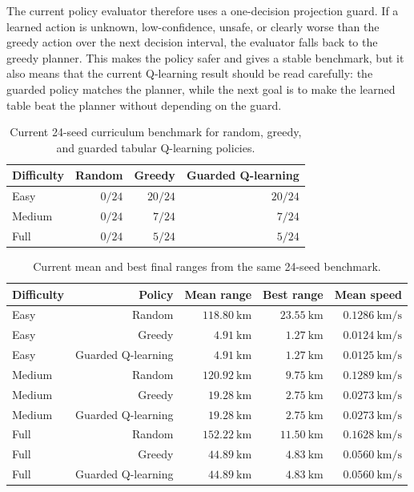 \documentclass[11pt]{article}
\begin{document}
The current policy evaluator therefore uses a one-decision projection guard.
If a learned action is unknown, low-confidence, unsafe, or clearly worse than the greedy action over the next decision interval, the evaluator falls back to the greedy planner.
This makes the policy safer and gives a stable benchmark, but it also means that the current Q-learning result should be read carefully: the guarded policy matches the planner, while the next goal is to make the learned table beat the planner without depending on the guard.

\begin{table}[h]
\centering
\begin{tabular}{lrrr}
\toprule
Difficulty & Random & Greedy & Guarded Q-learning \\
\midrule
Easy & \(0/24\) & \(20/24\) & \(20/24\) \\
Medium & \(0/24\) & \(7/24\) & \(7/24\) \\
Full & \(0/24\) & \(5/24\) & \(5/24\) \\
\bottomrule
\end{tabular}
\caption{Current 24-seed curriculum benchmark for random, greedy, and guarded tabular Q-learning policies.}
\end{table}

\begin{table}[h]
\centering
\begin{tabular}{lrrrr}
\toprule
Difficulty & Policy & Mean range & Best range & Mean speed \\
\midrule
Easy & Random & \(118.80~\mathrm{km}\) & \(23.55~\mathrm{km}\) & \(0.1286~\mathrm{km/s}\) \\
Easy & Greedy & \(4.91~\mathrm{km}\) & \(1.27~\mathrm{km}\) & \(0.0124~\mathrm{km/s}\) \\
Easy & Guarded Q-learning & \(4.91~\mathrm{km}\) & \(1.27~\mathrm{km}\) & \(0.0125~\mathrm{km/s}\) \\
Medium & Random & \(120.92~\mathrm{km}\) & \(9.75~\mathrm{km}\) & \(0.1289~\mathrm{km/s}\) \\
Medium & Greedy & \(19.28~\mathrm{km}\) & \(2.75~\mathrm{km}\) & \(0.0273~\mathrm{km/s}\) \\
Medium & Guarded Q-learning & \(19.28~\mathrm{km}\) & \(2.75~\mathrm{km}\) & \(0.0273~\mathrm{km/s}\) \\
Full & Random & \(152.22~\mathrm{km}\) & \(11.50~\mathrm{km}\) & \(0.1628~\mathrm{km/s}\) \\
Full & Greedy & \(44.89~\mathrm{km}\) & \(4.83~\mathrm{km}\) & \(0.0560~\mathrm{km/s}\) \\
Full & Guarded Q-learning & \(44.89~\mathrm{km}\) & \(4.83~\mathrm{km}\) & \(0.0560~\mathrm{km/s}\) \\
\bottomrule
\end{tabular}
\caption{Current mean and best final ranges from the same 24-seed benchmark.}
\end{table}
\end{document}
